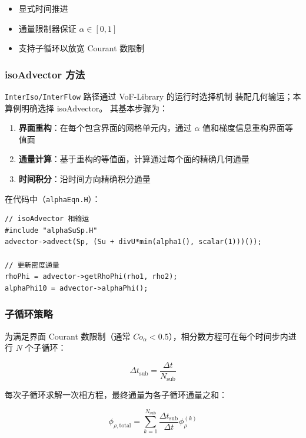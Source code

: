\documentclass[11pt,a4paper]{article}
\begin{document}
\begin{itemize}
    \item 显式时间推进
    \item 通量限制器保证 $\alpha \in [0, 1]$
    \item 支持子循环以放宽 Courant 数限制
\end{itemize}

\subsubsection{isoAdvector 方法}

\texttt{InterIso/InterFlow} 路径通过 VoF-Library 的运行时选择机制
装配几何输运；本算例明确选择 isoAdvector\cite{Roenby2016}。
其基本步骤为：

\begin{enumerate}
    \item \textbf{界面重构}：在每个包含界面的网格单元内，通过 $\alpha$ 值和梯度信息重构界面等值面
    \item \textbf{通量计算}：基于重构的等值面，计算通过每个面的精确几何通量
    \item \textbf{时间积分}：沿时间方向精确积分通量
\end{enumerate}

在代码中（\texttt{alphaEqn.H}）：

\begin{lstlisting}[style=cppstyle]
// isoAdvector 相输运
#include "alphaSuSp.H"
advector->advect(Sp, (Su + divU*min(alpha1(), scalar(1)))());

// 更新密度通量
rhoPhi = advector->getRhoPhi(rho1, rho2);
alphaPhi10 = advector->alphaPhi();
\end{lstlisting}

\subsubsection{子循环策略}

为满足界面 Courant 数限制（通常 $Co_\alpha < 0.5$），相分数方程可在每个时间步内进行 $N$ 个子循环：

\begin{equation}
\Delta t_{\text{sub}} = \frac{\Delta t}{N_{\text{sub}}}
\end{equation}

每次子循环求解一次相方程，最终通量为各子循环通量之和：

\begin{equation}
\phi_{\rho, \text{total}} = \sum_{k=1}^{N_{\text{sub}}} \frac{\Delta t_{\text{sub}}}{\Delta t} \phi_{\rho}^{(k)}
\end{equation}
\end{document}
